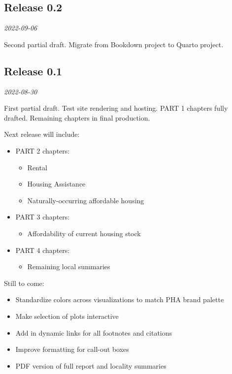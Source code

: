 \documentclass[
  letterpaper,
  DIV=11,
  numbers=noendperiod]{scrreprt}
\providecommand{\tightlist}{%
  \setlength{\itemsep}{0pt}\setlength{\parskip}{0pt}}\usepackage{longtable,booktabs,array}
\begin{document}
\hypertarget{release-0.2}{%
\subsection*{Release 0.2}\label{release-0.2}}

\emph{2022-09-06}

Second partial draft. Migrate from Bookdown project to Quarto project.

\hypertarget{release-0.1}{%
\subsection*{Release 0.1}\label{release-0.1}}

\emph{2022-08-30}

First partial draft. Test site rendering and hosting. PART 1 chapters
fully drafted. Remaining chapters in final production.

Next release will include:

\begin{itemize}
\tightlist
\item
  PART 2 chapters:

  \begin{itemize}
  \tightlist
  \item
    Rental
  \item
    Housing Assistance
  \item
    Naturally-occurring affordable housing
  \end{itemize}
\item
  PART 3 chapters:

  \begin{itemize}
  \tightlist
  \item
    Affordability of current housing stock
  \end{itemize}
\item
  PART 4 chapters:

  \begin{itemize}
  \tightlist
  \item
    Remaining local summaries
  \end{itemize}
\end{itemize}

Still to come:

\begin{itemize}
\tightlist
\item
  Standardize colors across visualizations to match PHA brand palette
\item
  Make selection of plots interactive
\item
  Add in dynamic links for all footnotes and citations
\item
  Improve formatting for call-out boxes
\item
  PDF version of full report and locality summaries
\end{itemize}
\end{document}

